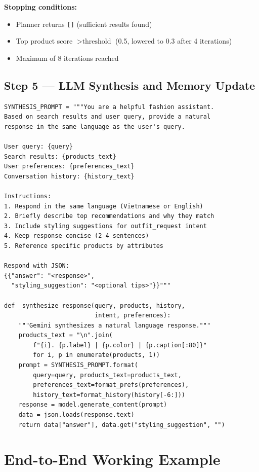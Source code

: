 \documentclass[12pt, twoside]{report}
\begin{document}
\textbf{Stopping conditions:}
\begin{itemize}
    \item Planner returns \texttt{[]} (sufficient results found)
    \item Top product score $> \text{threshold}$ (0.5, lowered to 0.3 after 4 iterations)
    \item Maximum of 8 iterations reached
\end{itemize}

\section{Step 5 --- LLM Synthesis and Memory Update}

\begin{lstlisting}[caption={LLM Synthesis --- agent/fashion\_agent.py}]
SYNTHESIS_PROMPT = """You are a helpful fashion assistant.
Based on search results and user query, provide a natural
response in the same language as the user's query.

User query: {query}
Search results: {products_text}
User preferences: {preferences_text}
Conversation history: {history_text}

Instructions:
1. Respond in the same language (Vietnamese or English)
2. Briefly describe top recommendations and why they match
3. Include styling suggestions for outfit_request intent
4. Keep response concise (2-4 sentences)
5. Reference specific products by attributes

Respond with JSON:
{{"answer": "<response>",
  "styling_suggestion": "<optional tips>"}}"""

def _synthesize_response(query, products, history,
                         intent, preferences):
    """Gemini synthesizes a natural language response."""
    products_text = "\n".join(
        f"{i}. {p.label} | {p.color} | {p.caption[:80]}"
        for i, p in enumerate(products, 1))
    prompt = SYNTHESIS_PROMPT.format(
        query=query, products_text=products_text,
        preferences_text=format_prefs(preferences),
        history_text=format_history(history[-6:]))
    response = model.generate_content(prompt)
    data = json.loads(response.text)
    return data["answer"], data.get("styling_suggestion", "")
\end{lstlisting}

\chapter{End-to-End Working Example}
\end{document}
